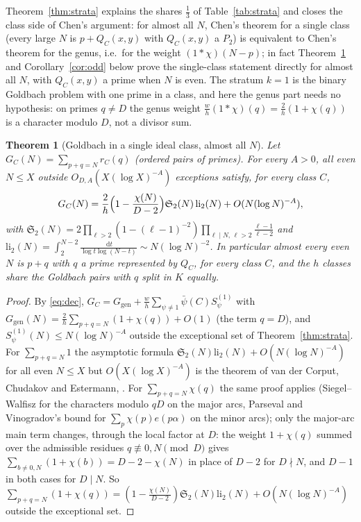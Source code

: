 \documentclass[11pt]{amsart}
\newtheorem{theorem}{Theorem}[section]
\theoremstyle{remark}
\newcommand{\sS}{\mathfrak S}
\newcommand{\dd}{\,\mathrm d}
\newcommand{\gen}{\mathrm{gen}}
\begin{document}
Theorem~\ref{thm:strata} explains the shares $\frac13$ of Table~\ref{tab:strata} and closes the class side of Chen's argument: for almost all $N$, Chen's theorem for a single class (every large $N$ is $p+Q_C(x,y)$ with $Q_C(x,y)$ a $P_2$) is equivalent to Chen's theorem for the genus, i.e.\ for the weight $(1*\chi)(N-p)$; in fact Theorem~\ref{thm:goldbach} and Corollary~\ref{cor:odd} below prove the single-class statement directly for almost all $N$, with $Q_C(x,y)$ a prime when $N$ is even. The stratum $k=1$ is the binary Goldbach problem with one prime in a class, and here the genus part needs no hypothesis: on primes $q\ne D$ the genus weight $\frac wh(1*\chi)(q)=\frac2h(1+\chi(q))$ is a character modulo $D$, not a divisor sum.

\begin{theorem}[Goldbach in a single ideal class, almost all $N$]\label{thm:goldbach}
Let $G_C(N)=\sum_{p+q=N}r_C(q)$ (ordered pairs of primes). For every $A>0$, all even $N\le X$ outside $O_{D,A}(X(\log X)^{-A})$ exceptions satisfy, for every class $C$,
\[
G_C(N)=\frac2h\Bigl(1-\frac{\chi(N)}{D-2}\Bigr)\sS_2(N)\,\mathrm{li}_2(N)+O(N(\log N)^{-A}),
\]
with $\sS_2(N)=2\prod_{\ell>2}(1-(\ell-1)^{-2})\prod_{\ell\mid N,\,\ell>2}\frac{\ell-1}{\ell-2}$ and $\mathrm{li}_2(N)=\int_2^{N-2}\frac{\dd t}{\log t\log(N-t)}\sim N(\log N)^{-2}$. In particular almost every even $N$ is $p+q$ with $q$ a prime represented by $Q_C$, for every class $C$, and the $h$ classes share the Goldbach pairs with $q$ split in $K$ equally.
\end{theorem}
\begin{proof}
By \eqref{eq:dec}, $G_C=G_\gen+\frac wh\sum_{\psi\ne1}\bar\psi(C)S^{(1)}_\psi$ with $G_\gen(N)=\frac2h\sum_{p+q=N}(1+\chi(q))+O(1)$ (the term $q=D$), and $S^{(1)}_\psi(N)\le N(\log N)^{-A}$ outside the exceptional set of Theorem~\ref{thm:strata}. For $\sum_{p+q=N}1$ the asymptotic formula $\sS_2(N)\mathrm{li}_2(N)+O(N(\log N)^{-A})$ for all even $N\le X$ but $O(X(\log X)^{-A})$ is the theorem of van der Corput, Chudakov and Estermann, \cite[Theorem~3.7]{Vaughan}. For $\sum_{p+q=N}\chi(q)$ the same proof applies (Siegel--Walfisz for the characters modulo $qD$ on the major arcs, Parseval and Vinogradov's bound for $\sum_p\chi(p)e(p\alpha)$ on the minor arcs); only the major-arc main term changes, through the local factor at $D$: the weight $1+\chi(q)$ summed over the admissible residues $q\not\equiv0,N\pmod D$ gives $\sum_{b\ne0,N}(1+\chi(b))=D-2-\chi(N)$ in place of $D-2$ for $D\nmid N$, and $D-1$ in both cases for $D\mid N$. So $\sum_{p+q=N}(1+\chi(q))=(1-\frac{\chi(N)}{D-2})\sS_2(N)\mathrm{li}_2(N)+O(N(\log N)^{-A})$ outside the exceptional set.
\end{proof}
\end{document}
